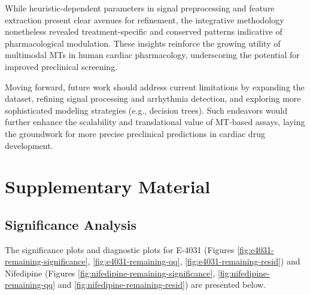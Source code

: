 \documentclass{report}
\begin{document}
    While heuristic-dependent parameters in signal preprocessing and feature extraction present clear avenues for refinement, the integrative methodology nonetheless revealed treatment-specific and conserved patterns indicative of pharmacological modulation. These insights reinforce the growing utility of multimodal MTs in human cardiac pharmacology, underscoring the potential for improved preclinical screening. 
    
    Moving forward, future work should address current limitations by expanding the dataset, refining signal processing and arrhythmia detection, and exploring more sophisticated modeling strategies (e.g., decision trees). Such endeavors would further enhance the scalability and translational value of MT-based assays, laying the groundwork for more precise preclinical predictions in cardiac drug development.
    
    

\printbibliography


\appendix  %

\chapter{Supplementary Material}  %

    \section{Significance Analysis}
            The significance plots and diagnostic plots for E-4031 (Figures \ref{fig:e4031-remaining-significance}, \ref{fig:e4031-remaining-qq}, \ref{fig:e4031-remaining-resid}) and Nifedipine (Figures \ref{fig:nifedipine-remaining-significance}, \ref{fig:nifedipine-remaining-qq} and \ref{fig:nifedipine-remaining-resid}) are presented below.
        
\end{document}
